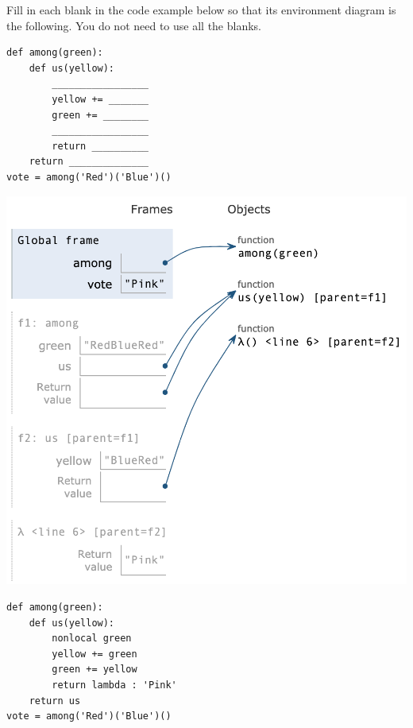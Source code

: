 \begin{blocksection}
\question Fill in each blank in the code example below so that its environment diagram is the following. You do not need to use all the blanks.

\begin{multicols}{2}
\begin{lstlisting}
def among(green):
    def us(yellow):
        _________________
        yellow += _______
        green += ________
        _________________
        return __________
    return ______________
vote = among('Red')('Blue')()
\end{lstlisting}

\columnbreak
\includegraphics[width=.45\textwidth]{reverse_test.png}
\end{multicols}

\begin{solution}[2in]
\begin{lstlisting}
def among(green):
    def us(yellow):
        nonlocal green
        yellow += green
        green += yellow
        return lambda : 'Pink'
    return us
vote = among('Red')('Blue')()
\end{lstlisting}
\end{solution}
\end{blocksection}
